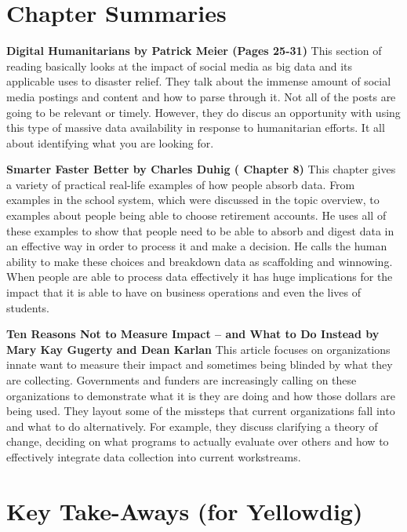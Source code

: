 \documentclass[]{book}
\begin{document}
\hypertarget{chapter-summaries-1}{%
\section{Chapter Summaries}\label{chapter-summaries-1}}

\textbf{Digital Humanitarians by Patrick Meier (Pages 25-31)}
This section of reading basically looks at the impact of social media as big data and its applicable uses to disaster relief. They talk about the immense amount of social media postings and content and how to parse through it. Not all of the posts are going to be relevant or timely. However, they do discus an opportunity with using this type of massive data availability in response to humanitarian efforts. It all about identifying what you are looking for.

\textbf{Smarter Faster Better by Charles Duhig ( Chapter 8)}
This chapter gives a variety of practical real-life examples of how people absorb data. From examples in the school system, which were discussed in the topic overview, to examples about people being able to choose retirement accounts. He uses all of these examples to show that people need to be able to absorb and digest data in an effective way in order to process it and make a decision. He calls the human ability to make these choices and breakdown data as scaffolding and winnowing. When people are able to process data effectively it has huge implications for the impact that it is able to have on business operations and even the lives of students.

\textbf{Ten Reasons Not to Measure Impact -- and What to Do Instead by Mary Kay Gugerty and Dean Karlan}
This article focuses on organizations innate want to measure their impact and sometimes being blinded by what they are collecting. Governments and funders are increasingly calling on these organizations to demonstrate what it is they are doing and how those dollars are being used. They layout some of the missteps that current organizations fall into and what to do alternatively. For example, they discuss clarifying a theory of change, deciding on what programs to actually evaluate over others and how to effectively integrate data collection into current workstreams.

\hypertarget{key-take-aways-for-yellowdig-1}{%
\section{Key Take-Aways (for Yellowdig)}\label{key-take-aways-for-yellowdig-1}}
\end{document}
